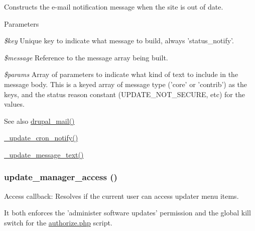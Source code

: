Constructs the e-\/mail notification message when the site is out of date.


\begin{DoxyParams}{Parameters}
\item[{\em \$key}]Unique key to indicate what message to build, always 'status\_\-notify'. \item[{\em \$message}]Reference to the message array being built. \item[{\em \$params}]Array of parameters to indicate what kind of text to include in the message body. This is a keyed array of message type ('core' or 'contrib') as the keys, and the status reason constant (UPDATE\_\-NOT\_\-SECURE, etc) for the values.\end{DoxyParams}
\begin{DoxySeeAlso}{See also}
\hyperlink{mail_8inc_ab80781fd7273975a77cbbd13300eddbf}{drupal\_\-mail()} 

\hyperlink{update_8fetch_8inc_a55d78e25faf69f49cfc88f2642c06f4e}{\_\-update\_\-cron\_\-notify()} 

\hyperlink{update_8module_aeaeb10c15564cced4147737f310a8198}{\_\-update\_\-message\_\-text()} 
\end{DoxySeeAlso}
\hypertarget{update_8module_a898d2cad139371b7c3ab5e9463ceedf4}{
\subsubsection[{update\_\-manager\_\-access}]{\setlength{\rightskip}{0pt plus 5cm}update\_\-manager\_\-access ()}}
\label{update_8module_a898d2cad139371b7c3ab5e9463ceedf4}
Access callback: Resolves if the current user can access updater menu items.

It both enforces the 'administer software updates' permission and the global kill switch for the \hyperlink{authorize_8php}{authorize.php} script.

